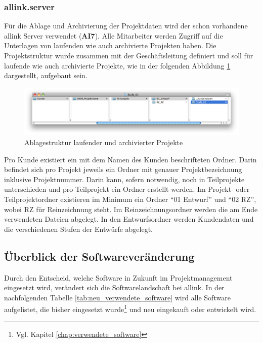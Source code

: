 \subsubsection{allink.server}
Für die Ablage und Archivierung der Projektdaten wird der schon vorhandene
allink Server verwendet (\textbf{AI7}). Alle Mitarbeiter werden Zugriff auf die Unterlagen
von laufenden wie auch archivierte Projekten haben. Die Projektstruktur
wurde zusammen mit der Geschäftsleitung definiert und soll für laufende
wie auch archivierte Projekte, wie in der folgenden Abbildung \ref{pic:05_ablagestruktur} 
dargestellt, aufgebaut sein.

\begin{figure}[htbp]
\begin{center}
\includegraphics[width=1.0\textwidth,angle=0]{./bilder/loesung/05_ablagestruktur.png}
\caption[Ablagestruktur laufender und archivierter Projekte]{Ablagestruktur 
    laufender und archivierter Projekte\footnotemark}
\label{pic:05_ablagestruktur}
\end{center}
\end{figure}

Pro Kunde existiert ein mit dem Namen des Kunden beschrifteten Ordner. Darin befindet
sich pro Projekt jeweils ein Ordner mit genauer Projektbezeichnung inklusive Projektnummer.
Darin kann, sofern notwendig, noch in Teilprojekte unterschieden und
pro Teilprojekt ein Ordner erstellt werden. Im Projekt- oder Teilprojektordner
existieren im Minimum ein Ordner ``01 Entwurf'' und ``02 RZ'', wobei RZ für Reinzeichnung
steht. Im Reinzeichnungsordner werden die am Ende verwendeten Dateien abgelegt.
In den Entwurfsordner werden Kundendaten und die verschiedenen Stufen der Entwürfe
abgelegt.

\subsection{Überblick der Softwareveränderung}
Durch den Entscheid, welche Software in Zukunft im Projektmanagement eingesetzt
wird, verändert sich die Softwarelandschaft bei allink. In der nachfolgenden
Tabelle \ref{tab:neu_verwendete_software} wird alle Software aufgelistet, die 
bisher eingesetzt wurde\footnote{Vgl. Kapitel \ref{chap:verwendete_software}} 
und neu eingekauft oder entwickelt wird.

